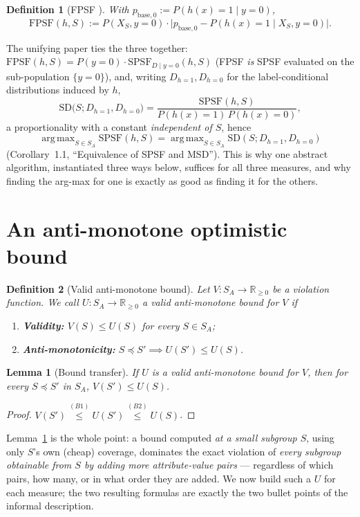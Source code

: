 \documentclass[11pt]{article}
\DeclareMathOperator{\argmax}{arg\,max}
\newtheorem{definition}{Definition}
\newtheorem{lemma}{Lemma}
\begin{document}
\begin{definition}[FPSF \cite{kearns18}]
With $p_{\mathrm{base},0}:=P(h(x)=1\mid y=0)$,
\[
\mathrm{FPSF}(h,S):=P(X_S,y=0)\cdot\bigl|p_{\mathrm{base},0}-P(h(x)=1\mid X_S,y=0)\bigr|.
\]
\end{definition}

The unifying paper ties the three together: $\mathrm{FPSF}(h,S)=P(y=0)\cdot
\mathrm{SPSF}_{D\mid y=0}(h,S)$ (FPSF \emph{is} SPSF evaluated on the sub-population
$\{y=0\}$), and, writing $D_{h=1},D_{h=0}$ for the label-conditional distributions
induced by $h$,
\[
\mathrm{SD}\bigl(S;D_{h=1},D_{h=0}\bigr)=\frac{\mathrm{SPSF}(h,S)}{P(h(x)=1)\,P(h(x)=0)},
\]
a proportionality with a constant \emph{independent of $S$}, hence
\[
\argmax_{S\in S_A}\mathrm{SPSF}(h,S)=\argmax_{S\in S_A}\mathrm{SD}(S;D_{h=1},D_{h=0})
\]
(Corollary~1.1, ``Equivalence of SPSF and MSD''). This is why one abstract algorithm,
instantiated three ways below, suffices for all three measures, and why finding the
arg-max for one is exactly as good as finding it for the others.

\section{An anti-monotone optimistic bound}

\begin{definition}[Valid anti-monotone bound]
Let $V:S_A\to\mathbb{R}_{\ge0}$ be a violation function. We call
$U:S_A\to\mathbb{R}_{\ge0}$ a \emph{valid anti-monotone bound} for $V$ if
\begin{enumerate}[label=(B\arabic*)]
\item \textbf{Validity:} $V(S)\le U(S)$ for every $S\in S_A$;
\item \textbf{Anti-monotonicity:} $S\preceq S' \implies U(S')\le U(S)$.
\end{enumerate}
\end{definition}

\begin{lemma}[Bound transfer]\label{lem:transfer}
If $U$ is a valid anti-monotone bound for $V$, then for every $S\preceq S'$ in $S_A$,
$V(S')\le U(S)$.
\end{lemma}
\begin{proof}
$V(S')\overset{(B1)}{\le}U(S')\overset{(B2)}{\le}U(S)$.
\end{proof}

Lemma~\ref{lem:transfer} is the whole point: a bound computed \emph{at a small
subgroup $S$}, using only $S$'s own (cheap) coverage, dominates the exact violation of
\emph{every subgroup obtainable from $S$ by adding more attribute-value pairs} —
regardless of which pairs, how many, or in what order they are added. We now build such
a $U$ for each measure; the two resulting formulas are exactly the two bullet points of
the informal description.
\end{document}
